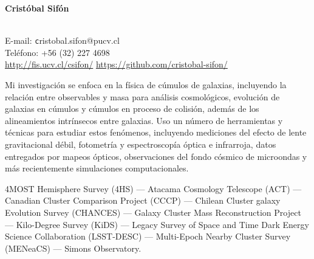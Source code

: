 \documentclass[11pt]{article}
\begin{document}
\begin{minipage}[b]{0.46\linewidth}
\flushleft
\hspace{-0.7cm}
{\bf\huge Crist\'obal Sif\'on}\\\vspace{0.2cm}
\\
\end{minipage}
\begin{minipage}[b]{0.49\linewidth}
\flushright
{\large E-mail: {\texttt cristobal.sifon@pucv.cl}\\
        Teléfono: +56 (32) 227 4698\\
        \url{http://fis.ucv.cl/csifon/}
        \url{https://github.com/cristobal-sifon/}}
\end{minipage}
\vspace{0.4cm}
\hline




Mi investigación se enfoca en la física de cúmulos de galaxias, incluyendo la 
relación entre observables y masa para análisis cosmológicos, evolución de 
galaxias en cúmulos y cúmulos en proceso de colisión, además de los 
alineamientos intrínsecos entre galaxias. Uso un número de herramientas y 
técnicas para estudiar estos fenómenos, incluyendo mediciones del efecto de 
lente gravitacional débil, fotometría y espectroscopía óptica e infrarroja, 
datos entregados por mapeos ópticos, observaciones del fondo cósmico de 
microondas y más recientemente simulaciones computacionales.

\vspace{0.5cm}
{
 4MOST Hemisphere Survey (4HS) ---
 Atacama Cosmology Telescope (ACT) ---
 Canadian Cluster Comparison Project (CCCP) ---
 Chilean Cluster galaxy Evolution Survey (CHANCES) ---
 Galaxy Cluster Mass Reconstruction Project ---
 Kilo-Degree Survey (KiDS) ---
 Legacy Survey of Space and Time Dark Energy Science Collaboration (LSST-DESC) ---
 Multi-Epoch Nearby Cluster Survey (MENeaCS) ---
 Simons Observatory.
}
\end{document}
